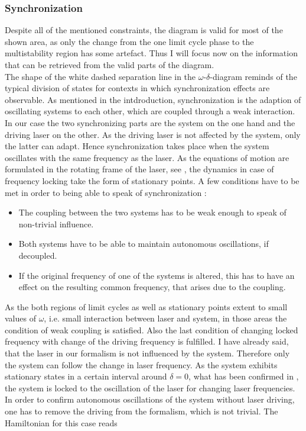 \subsubsection{Synchronization}\label{sec:synchronization}
Despite all of the mentioned constraints, the diagram is valid for most of the shown area, as only the change from the one limit cycle phase to the multistability region has some artefact. Thus I will focus now on the information that can be retrieved from the valid parts of the diagram.\\%
The shape of the white dashed separation line in the $\omega$-$\delta$-diagram reminds of the typical division of states for contexts in which synchronization effects are observable. As mentioned in the intdroduction, synchronization is the adaption of oscillating systems to each other, which are coupled through a weak interaction. In our case the two synchronizing parts are the system on the one hand and the driving laser on the other. As the driving laser is not affected by the system, only the latter can adapt. Hence synchronization takes place when the system oscillates with the same frequency as the laser. As the equations of motion are formulated in the rotating frame of the laser, see , the dynamics in case of frequency locking take the form of stationary points. A few conditions have to be met in order to being able to speak of synchronization \cite{pikovskij_synchronization_2007}:
\begin{itemize}
    \item The coupling between the two systems has to be weak enough to speak of non-trivial influence.
    \item Both systems have to be able to maintain autonomous oscillations, if decoupled.
    \item If the original frequency of one of the systems is altered, this has to have an effect on the resulting common frequency, that arises due to the coupling.
\end{itemize}
As the both regions of limit cycles as well as stationary points extent to small values of $\omega$, i.e. small interaction between laser and system, in those areas the condition of weak coupling is satisfied. Also the last condition of changing locked frequency with change of the driving frequency is fulfilled. I have already said, that the laser in our formalism is not influenced by the system. Therefore only the system can follow the change in laser frequency. As the system exhibits stationary states in a certain interval around $\delta=0$, what has been confirmed in , the system is locked to the oscillation of the laser for changing laser frequencies. In order to confirm autonomous oscillations of the system without laser driving, one has to remove the driving from the formalism, which is not trivial. The Hamiltonian for this case reads
